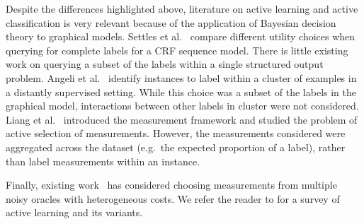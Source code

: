 Despite the differences highlighted above, literature on active learning and active classification is very relevant because of the application of Bayesian decision theory to graphical models. 
Settles et al.~\cite{settles2008analysis} compare different utility choices when querying for complete labels for a CRF sequence model.
There is little existing work on querying a subset of the labels within a single structured output problem.
Angeli et al.~\cite{angeli2014combining} identify instances to label within a cluster of examples in a distantly supervised setting. While this choice was a subset of the labels in the graphical model, interactions between other labels in cluster were not considered.
Liang et al.~\cite{liang09measurements} introduced the measurement framework and studied the problem of active selection of measurements. However, the measurements considered were aggregated across the dataset (e.g.\ the expected proportion of a label), rather than label measurements within an instance.


Finally, existing work~\cite{donmez2008proactive,golovin2010near,yan2011active,vijayanarasimhan2014large} has considered choosing measurements from multiple noisy oracles with heterogeneous costs.
We refer the reader to \cite{settles2010active} for a survey of active learning and its variants.






%

